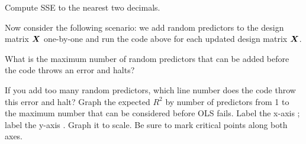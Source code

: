 \documentclass[12pt]{article}
\begin{document}
\vspace{-0.6cm}
 Compute SSE to the nearest two decimals.
\vspace{-0.0cm}
\pagebreak

Now consider the following scenario: we add random predictors to the design matrix $\boldsymbol{X}$ one-by-one and run the code above for each updated design matrix $\boldsymbol{X}$.

 What is the maximum number of random predictors that can be added before the code throws an error and halts? 

 If you add too many random predictors, which line number does the code throw this error and halt? 
 Graph the expected $R^2$ by number of predictors from 1 to the maximum number that can be considered before OLS fails. Label the x-axis ; label the y-axis . Graph it to scale. Be sure to mark critical points along both axes.\\

%
%
%
\end{document}
